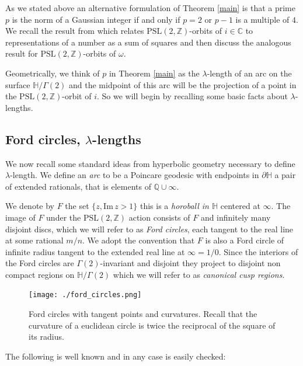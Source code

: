 \documentclass[12pt]{amsart}
\theoremstyle{plain}
\theoremstyle{definition}
\def\HH{\mathbb{H}}
\def\im{\mathrm{Im}\,}
\def\xx{\HH/g2}
\def\ZZ{\mathbb{Z}}
\def\CC{\mathbb{C}}
\def\QQ{\mathbb{Q}}
\def\sl2{\mathrm{PSL}(2, \ZZ)}
\def\g2{\Gamma(2)}
\def\xx{\HH/\g2}
\begin{document}
As we stated above an alternative formulation 
of Theorem \ref{main}  is that
a prime $p$ is the norm of a Gaussian integer
if and only if $p=2$ or $p-1$ is a multiple of $4$.
We recall the result from \cite{vlad} 
which relates $\sl2$-orbits of $i \in \CC$
to representations of a number as a sum of squares
and then discuss the analogous result for 
$\sl2$-orbits of $ \omega$.

Geometrically, we think of $p$ in Theorem \ref{main}
as the $\lambda$-length of an arc on the surface $\xx$
and the midpoint of this arc will be the projection 
of a point in the $\sl2$-orbit of $i$.
So we will begin by recalling some basic facts about
$\lambda$-lengths.

\subsection{Ford circles, $\lambda$-lengths} 
\label{lengths}

We now recall some standard ideas from hyperbolic geometry
necessary to define $\lambda$-length.
We define an \textit{arc} to be a Poincare geodesic
with endpoints in $\partial \HH$ a pair of extended rationals, 
that is elements of $\QQ \cup \infty$.

We denote by $F$ the set  $\{ z, \im z > 1\}$
this is a \textit{horoball in $\HH$} centered at $\infty$.
The image of $F$ under the $\sl2$ action consists of
$F$ and infinitely many disjoint discs, 
which we will refer to as \textit{Ford circles}, 
each tangent to the real line at some rational $m/n$.
We adopt the convention that $F$ is also a Ford circle of infinite radius
tangent to the extended real line at $\infty = 1/0$.
Since the interiors of the Ford circles are $\Gamma(2)$-invariant
and disjoint they project to disjoint non compact regions on $\xx$
which we will refer to as \textit{canonical cusp regions}.


\begin{figure}[ht]
\begin{center}
\texttt{[image: ./ford\_circles.png]} 
\end{center}
\caption{Ford circles with tangent points and curvatures.
Recall that the 
curvature of a euclidean circle is twice the reciprocal of the square of its radius.}%
\label{ford circles}
\end{figure}

The following is well known \cite{ford,conway} and in any case is easily checked:
\end{document}
